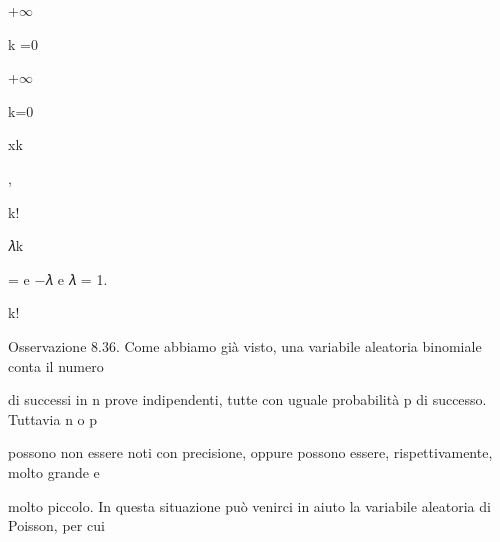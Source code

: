 \documentclass[a4paper,portrait,12pt]{article}
\begin{document}
+$\infty$


\begin{flushleft}
k =0
\end{flushleft}





+$\infty$


\begin{flushleft}
k=0
\end{flushleft}





\begin{flushleft}
xk
\end{flushleft}


,


\begin{flushleft}
k!
\end{flushleft}





\begin{flushleft}
𝜆k
\end{flushleft}


\begin{flushleft}
= e $-$𝜆 e 𝜆 = 1.
\end{flushleft}


\begin{flushleft}
k!
\end{flushleft}





\begin{flushleft}
Osservazione 8.36. Come abbiamo gi\`{a} visto, una variabile aleatoria binomiale conta il numero
\end{flushleft}


\begin{flushleft}
di successi in n prove indipendenti, tutte con uguale probabilit\`{a} p di successo. Tuttavia n o p
\end{flushleft}


\begin{flushleft}
possono non essere noti con precisione, oppure possono essere, rispettivamente, molto grande e
\end{flushleft}


\begin{flushleft}
molto piccolo. In questa situazione pu\`{o} venirci in aiuto la variabile aleatoria di Poisson, per cui
\end{flushleft}
\end{document}
